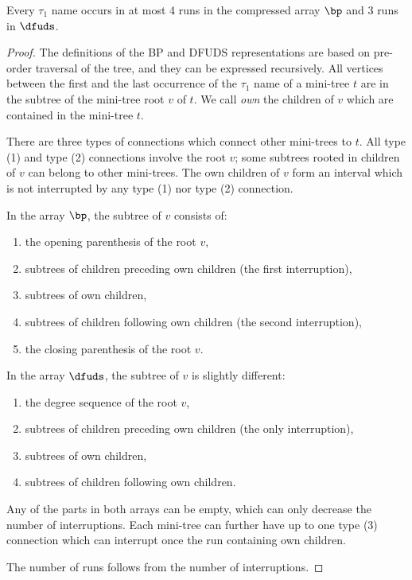 \begin{lemma}\label{l:usr-runs}
	Every $\tau_1$ name occurs in at most 4 runs in the compressed array $\bp$ and 3 runs in $\dfuds$.
\end{lemma}
\begin{proof}
	The definitions of the BP and DFUDS representations are based on pre-order traversal of the tree, and they can be expressed recursively.
	All vertices between the first and the last occurrence of the $\tau_1$ name of a mini-tree $t$ are in the subtree of the mini-tree root $v$ of $t$.
	We call \emph{own} the children of $v$ which are contained in the mini-tree $t$.
	
	There are three types of connections which connect other mini-trees to $t$.
	All type (1) and type (2) connections involve the root $v$; some subtrees rooted in children of $v$ can belong to other mini-trees.
	The own children of $v$ form an interval which is not interrupted by any type (1) nor type (2) connection.
	
	In the array $\bp$, the subtree of $v$ consists of:
	\begin{enumerate}
		\item the opening parenthesis of the root $v$,
		\item subtrees of children preceding own children (the first interruption),
		\item subtrees of own children,
		\item subtrees of children following own children (the second interruption),
		\item the closing parenthesis of the root $v$.
	\end{enumerate}
	
	In the array $\dfuds$, the subtree of $v$ is slightly different:
	\begin{enumerate}
		\item the degree sequence of the root $v$,
		\item subtrees of children preceding own children (the only interruption),
		\item subtrees of own children,
		\item subtrees of children following own children.
	\end{enumerate}
	
	Any of the parts in both arrays can be empty, which can only decrease the number of interruptions.
	Each mini-tree can further have up to one type (3) connection which can interrupt once the run containing own children.
	
	The number of runs follows from the number of interruptions.
\end{proof}

